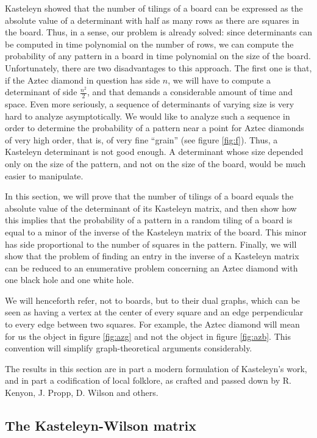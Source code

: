 \documentclass[10pt,reqno]{amsart}
\theoremstyle{plain}
\theoremstyle{definition}
\theoremstyle{remark}
\begin{document}
Kasteleyn \cite{Kast} showed that the number of tilings of a board can
be expressed as the absolute value of a determinant with half as many rows
as there are squares in the board. Thus, in a sense, our problem is already
solved: since determinants can be computed in time polynomial on the
number of rows, we can compute the probability of any pattern in a board
in time polynomial on the size of the board. Unfortunately, there are two
disadvantages to this approach. The first one is that, if the Aztec
diamond in question has side $n$, we will have to compute a determinant
of side $\frac{n^2}{2}$, and that demands a considerable amount
of time and space. Even more seriously, a
sequence of determinants of varying size is very hard to analyze 
asymptotically. We would like to analyze such a sequence in order to
determine the probability of a pattern near a point for Aztec diamonds
of very high order, that is, of very fine ``grain'' (see figure
\ref{fig:f}).
Thus, a Kasteleyn determinant is not good enough.
A determinant whose size depended only on the size of the pattern,
and not on the size of the board, would be much easier to manipulate.

In this section, we will prove that the number of tilings of a board
equals the absolute value of the determinant of its Kasteleyn matrix,
and then show how this implies that the probability of a pattern in a
random tiling of a board is equal to a minor of the inverse of the 
Kasteleyn matrix of the board. This minor has side proportional to
the number of squares in the pattern. Finally, we will show that
the problem of finding an entry in the inverse of a Kasteleyn matrix
can be reduced to an enumerative problem concerning an Aztec diamond
with one black hole and one white hole.

We will henceforth refer, not to boards, but to their dual graphs, 
which can be seen as having a vertex at the center of every square
and an edge perpendicular to every edge between two squares. For
example, the Aztec diamond will mean for us the object in figure
\ref{fig:azg} and not the object in figure \ref{fig:azb}. This convention
will simplify graph-theoretical arguments considerably.

The results in this section are in part a modern formulation of Kasteleyn's
work, and in part a codification of local folklore, as crafted and passed
down by R. Kenyon, J. Propp, D. Wilson and others. 

\subsection{The Kasteleyn-Wilson matrix}
\end{document}
